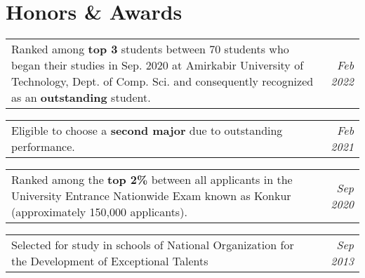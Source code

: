 
\section{Honors \& Awards} 
 
	\begin{tabularx}{\textwidth}{Xr}
		Ranked among \textbf{top 3} students between 70 students who began their studies in Sep. 2020 at Amirkabir University of Technology, Dept. of Comp. Sci. and consequently recognized as an \textbf{outstanding} student. & \textit{Feb 2022}
	\end{tabularx}
	
	\vspace{0.20cm} 
	
	\begin{tabularx}{\textwidth}{Xr}
		Eligible to choose a \textbf{second major} due to outstanding performance. & \textit{Feb 2021}
	\end{tabularx}
	
	\vspace{0.20cm}	
	
	\begin{tabularx}{\textwidth}{Xr}
		Ranked among the \textbf{top 2\%} between all applicants in the University Entrance Nationwide Exam known as Konkur (approximately 150,000 applicants). & \textit{Sep 2020}
	\end{tabularx}
	
	\vspace{0.20cm}
	
	\begin{tabularx}{\textwidth}{Xr}
	Selected for study in schools of National Organization for the Development of Exceptional Talents
	& \textit{Sep 2013}
	\end{tabularx}
	
	